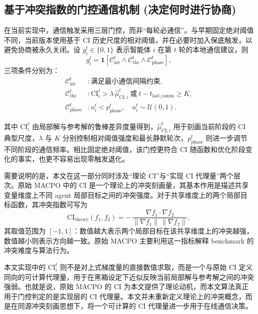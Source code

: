 \documentclass[conference]{IEEEtran}
\begin{document}
\subsection{基于冲突指数的门控通信机制 (决定何时进行协商)}\label{ux57faux4e8eux51b2ux7a81ux6307ux6570ux7684ux95e8ux63a7ux901aux4fe1ux673aux5236-ux51b3ux5b9aux4f55ux65f6ux8fdbux884cux534fux5546}

在当前实现中，通信触发采用三层门控，而非“每轮必通信”。与早期固定绝对阈值不同，当前版本使用基于 CI 历史尺度的相对阈值，并在必要时加入保底触发，以避免协商被永久关闭。设 $g_i^t\in\{0,1\}$ 表示智能体 $i$ 在第 $t$ 轮的本地通信建议，则
\[
g_i^t=\mathbf{1}\!\left[\mathcal{C}_{\mathrm{int}}^t\land \mathcal{C}_{\mathrm{thr}}^t\land \mathcal{C}_{\mathrm{phase}}^t\right],
\]
三项条件分别为：
\begin{align}
\mathcal{C}_{\mathrm{int}}^t &: \text{满足最小通信间隔约束},\\
\mathcal{C}_{\mathrm{thr}}^t &: \mathrm{CI}_i^t > \lambda\,\hat{\mu}_{\mathrm{CI},i}^t\ \text{或}\ t-t_{\mathrm{last\_comm}}\ge K,\\
\mathcal{C}_{\mathrm{phase}}^t &: u_i^t < p_{\mathrm{phase}}^t,\quad u_i^t\sim\mathcal{U}(0,1).
\end{align}

其中 $\mathrm{CI}_i^t$ 由局部解与参考解的鲁棒差异度量得到，$\hat{\mu}_{\mathrm{CI},i}^t$ 用于刻画当前阶段的 CI 典型尺度，$\lambda$ 与 $K$ 分别控制相对阈值强度和最长静默轮次，$p_{\mathrm{phase}}^t$ 则进一步调节不同阶段的通信频率。相比固定绝对阈值，该门控更符合 CI 随函数和优化阶段变化的事实，也更不容易出现零触发退化。

需要说明的是，本文在这一部分同时涉及“理论 CI”与“实现 CI 代理量”两个层次。原始 MACPO 中的 CI 是一个理论上的冲突刻画量，其基本作用是描述共享变量维度上不同 agent 局部目标之间的冲突强度。对于共享维度上的两个局部目标函数，其冲突指数可写为
\[
\mathrm{CI}_{\mathrm{theory}}(f_1,f_2)= -\,\frac{\nabla f_1\cdot \nabla f_2}{\|\nabla f_1\|\,\|\nabla f_2\|},
\]
其取值范围为 $[-1,1]$：数值越大表示两个局部目标在该共享维度上的冲突越强，数值越小则表示方向越一致。原始 MACPO 主要利用这一指标解释 benchmark 的冲突难度与算法行为。

本文实现中的 $\mathrm{CI}_i^t$ 则不是对上式梯度量的直接数值求取，而是一个与原始 CI 定义同向的可计算代理量，用于在黑箱设定下近似反映当前局部解与参考解之间的冲突强弱。也就是说，原始 MACPO 的 CI 为本文提供了理论动机，而本文算法真正用于门控判定的是实现层的 CI 代理量。本文并未重新定义理论上的冲突概念，而是在同源冲突刻画思想下，将一个可计算的 CI 代理量进一步用于在线通信决策。
\end{document}
